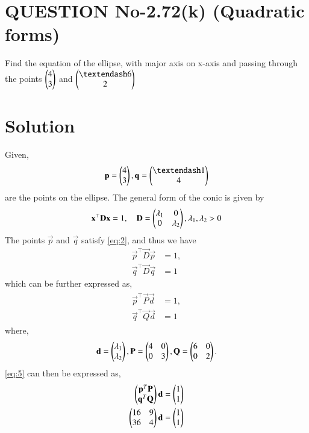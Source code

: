 \documentclass[journal,12pt,twocolumn]{IEEEtran}
\begin{document}
%
\section{QUESTION No-2.72(k) (Quadratic forms)}
\item Find the equation of the ellipse, with major axis on x-axis and passing through the points $\begin{pmatrix}4\\3\end{pmatrix}$  and $\myvec{– 6\\2}$ 
%
\section{Solution}
Given, 
\begin{align}
\vec{p} = \myvec{4\\3} , \vec{q} = \myvec{– 1\\4}
\end{align}
are the points on the ellipse.
The general form of the conic is given by
\begin{align}
\label{eq:2}
\mathbf{x}^{\top}\mathbf{D}\mathbf{x} = 1, \quad \mathbf{D} = \begin{pmatrix}\lambda_1 & 0 \\ 0 & \lambda_2\end{pmatrix}, \lambda_1,\lambda_2 > 0
\end{align}
The points $\vec{p}$ and $\vec{q}$ satisfy \eqref{eq:2}, and thus we have
\begin{align}
\label{eq:ellipse_std_ab}
\vec{p}^{\top}\vec{D}\vec{p} &= 1,
\\
\vec{q}^{\top}\vec{D}\vec{q} &= 1
\end{align}
which can be further expressed as,
\begin{align}
\label{eq:5}
\begin{split}
\vec{p}^{\top}\vec{P}\vec{d} &= 1,
\\
\vec{q}^{\top}\vec{Q}\vec{d} &= 1
\end{split}
\end{align}
where,
\begin{align}
\mathbf{d} = \begin{pmatrix}\lambda_1\\ \lambda_2\end{pmatrix},
\mathbf{P} = \begin{pmatrix}4 & 0 \\ 0 & 3\end{pmatrix},
\mathbf{Q} = \begin{pmatrix}6 & 0 \\ 0 & 2\end{pmatrix}.
\end{align}
\eqref{eq:5} can then be expressed as,
\begin{align}
\begin{pmatrix}\mathbf{p}^T\mathbf{P}\\ \mathbf{q}^T\mathbf{Q}\end{pmatrix}\mathbf{d} &= \begin{pmatrix}1\\1\end{pmatrix}\\
\begin{pmatrix}16 & 9\\ 36 & 4\end{pmatrix}\mathbf{d} &= \begin{pmatrix}1\\1\end{pmatrix}\label{eq:8}
\end{align}
\end{document}
